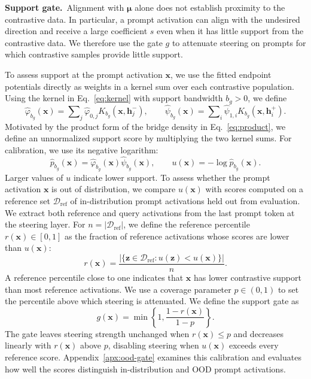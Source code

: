 \noindent\textbf{Support gate.}~Alignment with $\boldsymbol{\mu}$ alone does not establish proximity to the contrastive data. In particular, a prompt activation can align with the undesired direction and receive a large coefficient $s$ even when it has little support from the contrastive data. We therefore use the gate $g$ to attenuate steering on prompts for which contrastive samples provide little support.

To assess support at the prompt activation $\boldsymbol{x}$, we use the fitted endpoint potentials directly as weights in a kernel sum over each contrastive population. Using the kernel in Eq.~\eqref{eq:kernel} with support bandwidth $b_g>0$, we define
\begin{equation}
\displaystyle
\widehat{\varphi}_{b_g}(\boldsymbol{x})=\sum\nolimits_j \widehat{\varphi}_{0,j}K_{b_g}(\boldsymbol{x},\boldsymbol{h}_j^-),
\qquad
\widehat{\psi}_{b_g}(\boldsymbol{x})=\sum\nolimits_i \widehat{\psi}_{1,i}K_{b_g}(\boldsymbol{x},\boldsymbol{h}_i^+).
\label{eq:frozen-factors}
\end{equation}
Motivated by the product form of the bridge density in Eq.~\eqref{eq:product}, we define an unnormalized support score by multiplying the two kernel sums. For calibration, we use its negative logarithm:
\begin{equation}
\displaystyle
\hat{p}_{b_g}(\boldsymbol{x})
=\widehat{\varphi}_{b_g}(\boldsymbol{x})\widehat{\psi}_{b_g}(\boldsymbol{x}),
\qquad
u(\boldsymbol{x})=-\log\hat{p}_{b_g}(\boldsymbol{x}).
\label{eq:support-score}
\end{equation}
Larger values of $u$ indicate lower support. To assess whether the prompt activation $\boldsymbol{x}$ is out of distribution, we compare $u(\boldsymbol{x})$ with scores computed on a reference set $\mathcal{D}_{\mathrm{ref}}$ of in-distribution prompt activations held out from evaluation. We extract both reference and query activations from the last prompt token at the steering layer. For $n=|\mathcal{D}_{\mathrm{ref}}|$, we define the reference percentile $r(\boldsymbol{x})\in[0,1]$ as the fraction of reference activations whose scores are lower than $u(\boldsymbol{x})$:
\[
\displaystyle
r(\boldsymbol{x})
=\frac{|\{\boldsymbol{z}\in\mathcal{D}_{\mathrm{ref}}:u(\boldsymbol{z})<u(\boldsymbol{x})\}|}{n}.
\]
A reference percentile close to one indicates that $\boldsymbol{x}$ has lower contrastive support than most reference activations. We use a coverage parameter $p\in(0,1)$ to set the percentile above which steering is attenuated. We define the support gate as
\begin{equation}
\displaystyle
g(\boldsymbol{x})=\min\!\left\{1,\frac{1-r(\boldsymbol{x})}{1-p}\right\}.
\label{eq:gate}
\end{equation}
The gate leaves steering strength unchanged when $r(\boldsymbol{x})\le p$ and decreases linearly with $r(\boldsymbol{x})$ above $p$, disabling steering when $u(\boldsymbol{x})$ exceeds every reference score. Appendix~\ref{apx:ood-gate} examines this calibration and evaluates how well the scores distinguish in-distribution and OOD prompt activations.

